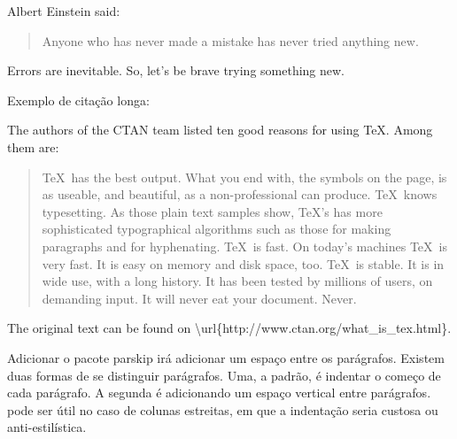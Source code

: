 \documentclass{article}
\begin{document}
Albert Einstein said:

\begin{quote}
    Anyone who has never made a mistake has never tried anything new.
\end{quote}
Errors are inevitable. So, let's be brave trying something new.


Exemplo de citação longa:

The authors of the CTAN team listed ten good reasons
for using \TeX. Among them are:
\begin{quotation}
 \TeX\ has the best output. What you end with,
the symbols on the page, is as useable, and beautiful,
as a non-professional can produce.
 \TeX\ knows typesetting. As those plain text samples
show, \TeX's has more sophisticated typographical algorithms
such as those for making paragraphs and for hyphenating.
 \TeX\ is fast. On today's machines \TeX\ is very fast.
 It is easy on memory and disk space, too.
 \TeX\ is stable. It is in wide use, with a long history.
 It has been tested by millions of users, on demanding input.
 It will never eat your document. Never.
\end{quotation}
The original text can be found on
\textbackslash url\{http://www.ctan.org/what\_is\_tex.html\}.

Adicionar o pacote parskip irá adicionar um espaço entre os parágrafos.
Existem duas formas de se distinguir parágrafos.
Uma, a padrão, é indentar o começo de cada parágrafo.
A segunda é adicionando um espaço vertical entre parágrafos.
pode ser útil no caso de colunas estreitas, em que a indentação seria custosa ou anti-estilística.
\end{document}
